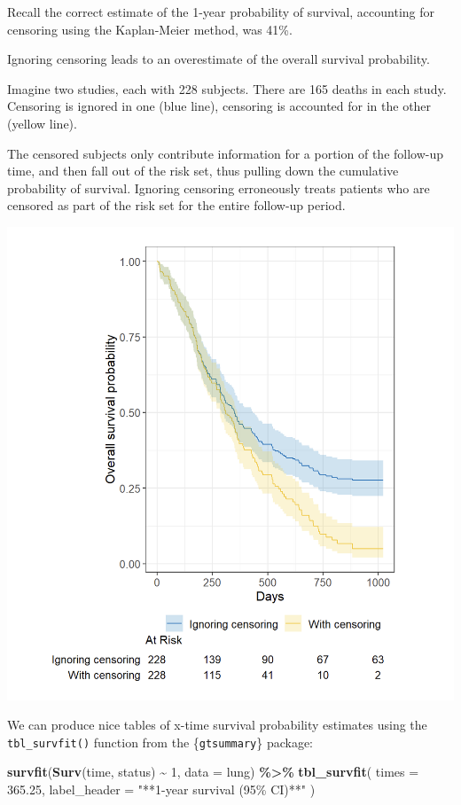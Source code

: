 \documentclass[
]{book}
\newenvironment{Shaded}{\begin{snugshade}}{\end{snugshade}}
\newcommand{\AttributeTok}[1]{\textcolor[rgb]{0.13,0.29,0.53}{#1}}
\newcommand{\DecValTok}[1]{\textcolor[rgb]{0.00,0.00,0.81}{#1}}
\newcommand{\FloatTok}[1]{\textcolor[rgb]{0.00,0.00,0.81}{#1}}
\newcommand{\FunctionTok}[1]{\textcolor[rgb]{0.13,0.29,0.53}{\textbf{#1}}}
\newcommand{\NormalTok}[1]{#1}
\newcommand{\SpecialCharTok}[1]{\textcolor[rgb]{0.81,0.36,0.00}{\textbf{#1}}}
\newcommand{\StringTok}[1]{\textcolor[rgb]{0.31,0.60,0.02}{#1}}
\begin{document}
Recall the correct estimate of the 1-year probability of survival, accounting for censoring using the Kaplan-Meier method, was 41\%.

Ignoring censoring leads to an overestimate of the overall survival probability.

Imagine two studies, each with 228 subjects. There are 165 deaths in each study. Censoring is ignored in one (blue line), censoring is accounted for in the other (yellow line).

The censored subjects only contribute information for a portion of the follow-up time, and then fall out of the risk set, thus pulling down the cumulative probability of survival. Ignoring censoring erroneously treats patients who are censored as part of the risk set for the entire follow-up period.

\includegraphics{figs/survival4.png}

We can produce nice tables of x-time survival probability estimates using the \texttt{tbl\_survfit()} function from the \{\texttt{gtsummary}\} package:

\begin{Shaded}
\begin{Highlighting}[]
\FunctionTok{survfit}\NormalTok{(}\FunctionTok{Surv}\NormalTok{(time, status) }\SpecialCharTok{\textasciitilde{}} \DecValTok{1}\NormalTok{, }\AttributeTok{data =}\NormalTok{ lung) }\SpecialCharTok{\%\textgreater{}\%} 
  \FunctionTok{tbl\_survfit}\NormalTok{(}
    \AttributeTok{times =} \FloatTok{365.25}\NormalTok{,}
    \AttributeTok{label\_header =} \StringTok{"**1{-}year survival (95\% CI)**"}
\NormalTok{  )}
\end{Highlighting}
\end{Shaded}
\end{document}
